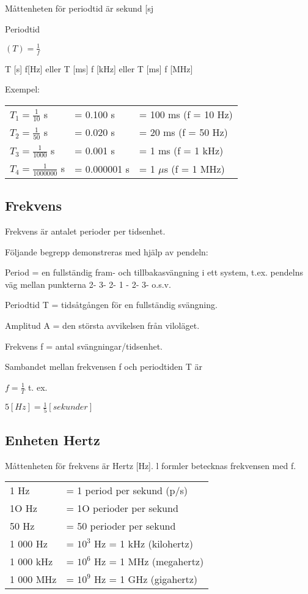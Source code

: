 Måttenheten för periodtid är sekund [sj

Periodtid

$(T) = \frac{1}{f}$

T [s] f[Hz] eller
T [ms] f [kHz] eller
T [ms] f [MHz]

Exempel:

\begin{center}
\begin{tabular}{lll}
$T_1=\frac{1}{10}$ s & = 0.100 s & = 100 ms (f = 10 Hz)\\
$T_2=\frac{1}{50}$ s & = 0.020 s & = 20 ms (f = 50 Hz)\\
$T_3=\frac{1}{1000}$ s & = 0.001 s & = 1 ms (f = 1 kHz)\\
$T_4=\frac{1}{1000000}$ s & = 0.000001 s & = 1 $\mu$s (f = 1 MHz)\\
\end{tabular}
\end{center}

\subsection{Frekvens}

Frekvens är antalet perioder per tidsenhet.

Följande begrepp demonstreras med hjälp av pendeln:

Period = en fullständig fram- och tillbakasvängning i ett system, t.ex. pendelns väg
mellan punkterna 2- 3- 2- 1 - 2- 3- o.s.v.

Periodtid T = tidsåtgången för en fullständig svängning.

Amplitud A = den största avvikelsen från viloläget.

Frekvens f = antal svängningar/tidsenhet.

Sambandet mellan frekvensen f och periodtiden T är

$f=\frac{1}{T}$ t. ex.

$5 [H z] = \frac{1}{5} [sekunder]$

\subsection{Enheten Hertz}

Måttenheten för frekvens är Hertz [Hz].
l formler betecknas frekvensen med f.

\begin{center}
\begin{tabular}{ll}
1 Hz      & = 1 period per sekund (p/s) \\
1O Hz     & = 1O perioder per sekund \\
50 Hz     & = 50 perioder per sekund \\
1 000 Hz  & = $10^3$ Hz = 1 kHz (kilohertz) \\
1 000 kHz & = $10^6$ Hz = 1 MHz (megahertz) \\
1 000 MHz & = $10^9$ Hz = 1 GHz (gigahertz) \\
\end{tabular}
\end{center}

